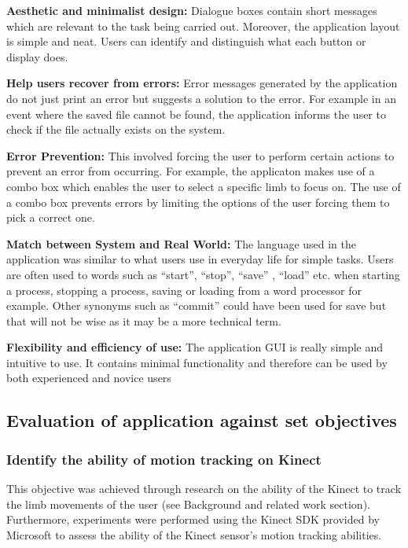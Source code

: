 \documentclass[a4paper, 12pt]{article}
\begin{document}
\textbf{Aesthetic and minimalist design:} Dialogue boxes contain short messages which are relevant to the task being carried out. Moreover, the application layout is simple and neat. Users can identify and distinguish what each button or display does.

\textbf{Help users recover from errors:} Error messages generated by the application do not just print an error but suggests a solution to the error. For example in an event where the saved file cannot be found, the application informs the user to check if the file actually exists on the system.

\textbf{Error Prevention:} This involved forcing the user to perform certain actions to prevent an error from occurring. For example, the applicaton makes use of a combo box which enables the user to select a specific limb to focus on. The use of a combo box prevents errors by limiting the options of the user forcing them to pick a correct one. 

\textbf{Match between System and Real World:} The language used in the application was similar to what users use in everyday life for simple tasks. Users are often used to words such as ``start'', ``stop'', ``save'' , ``load'' etc. when starting a process, stopping a process, saving or loading from a word processor for example. Other synonyms such as ``commit'' could have been used for save but that will not be wise as it may be a more technical term.  

\textbf{Flexibility and efficiency of use: } The application GUI is really simple and intuitive to use. It contains minimal functionality and therefore can be used by both experienced and novice users


\subsection{Evaluation of application against set objectives}

\subsubsection{Identify the ability of motion tracking on Kinect}
This objective was achieved through research on the ability of the Kinect to track the limb movements of the user (see Background and related work section). Furthermore, experiments were performed using the Kinect SDK provided by Microsoft to assess the ability of the Kinect sensor's motion tracking abilities. 
\end{document}
